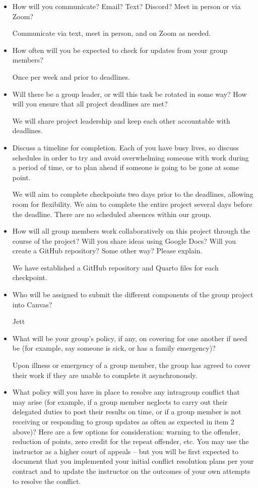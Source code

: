 \documentclass[
  letterpaper,
  DIV=11,
  numbers=noendperiod]{scrartcl}
\begin{document}
\begin{itemize}
\item
  How will you communicate? Email? Text? Discord? Meet in person or via
  Zoom?

  Communicate via text, meet in person, and on Zoom as needed.
\item
  How often will you be expected to check for updates from your group
  members?

  Once per week and prior to deadlines.
\item
  Will there be a group leader, or will this task be rotated in some
  way? How will you ensure that all project deadlines are met?

  We will share project leadership and keep each other accountable with
  deadlines.
\item
  Discuss a timeline for completion. Each of you have busy lives, so
  discuss schedules in order to try and avoid overwhelming someone with
  work during a period of time, or to plan ahead if someone is going to
  be gone at some point.

  We will aim to complete checkpoints two days prior to the deadlines,
  allowing room for flexibility. We aim to complete the entire project
  several days before the deadline. There are no scheduled absences
  within our group.
\item
  How will all group members work collaboratively on this project
  through the course of the project? Will you share ideas using Google
  Docs? Will you create a GitHub repository? Some other way? Please
  explain.

  We have established a GitHub repository and Quarto files for each
  checkpoint.
\item
  Who will be assigned to submit the different components of the group
  project into Canvas?

  Jett
\item
  What will be your group's policy, if any, on covering for one another
  if need be (for example, say someone is sick, or has a family
  emergency)?

  Upon illness or emergency of a group member, the group has agreed to
  cover their work if they are unable to complete it asynchronously.
\item
  What policy will you have in place to resolve any intragroup conflict
  that may arise (for example, if a group member neglects to carry out
  their delegated duties to post their results on time, or if a group
  member is not receiving or responding to group updates as often as
  expected in item 2 above)? Here are a few options for consideration:
  warning to the offender, reduction of points, zero credit for the
  repeat offender, etc. You may use the instructor as a higher court of
  appeals -- but you will be first expected to document that you
  implemented your initial conflict resolution plans per your contract
  and to update the instructor on the outcomes of your own attempts to
  resolve the conflict.


\end{itemize}
\end{document}
